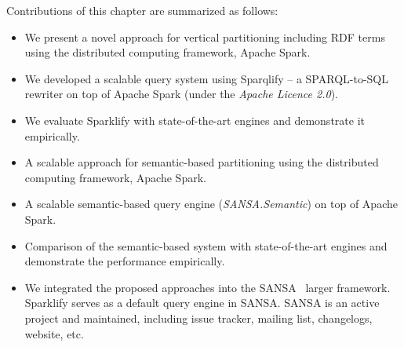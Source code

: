 Contributions of this chapter are summarized as follows:

\begin{itemize}
 \item We present a novel approach for vertical partitioning including \gls{RDF} terms using the distributed computing framework, Apache Spark.
 \item We developed a scalable query system using Sparqlify -- a SPARQL-to-SQL rewriter on top of Apache Spark (under the \textit{Apache Licence 2.0}).
 \item We evaluate Sparklify with state-of-the-art engines and demonstrate it empirically.
 \item A scalable approach for semantic-based partitioning using the distributed computing framework, Apache Spark.
 \item A scalable semantic-based query engine (\textit{SANSA.Semantic}) on top of Apache Spark.
 \item Comparison of the semantic-based system with state-of-the-art engines and demonstrate the performance empirically.
 \item We integrated the proposed approaches into the SANSA~\cite{lehmann-2017-sansa-iswc} larger framework.
 Sparklify serves as a default query engine in SANSA.
 SANSA is an active project and maintained, including issue tracker, mailing list, changelogs, website, etc.
\end{itemize}


